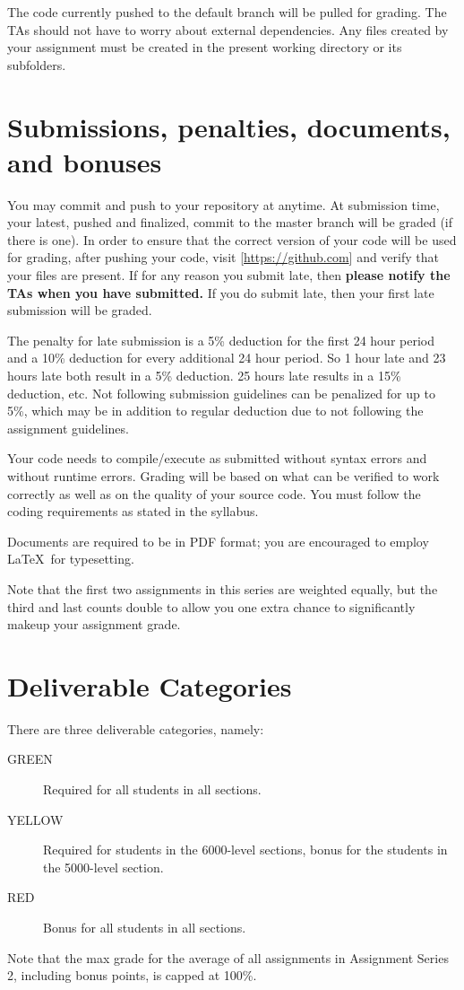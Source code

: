 \documentclass{article}
\begin{document}
The code currently pushed to the default branch will be pulled for grading. The TAs should not have to worry about external dependencies. Any files created by your assignment must be created in the present working directory or its subfolders.


\section*{Submissions, penalties, documents, and bonuses}
You may commit and push to your repository at anytime. At submission time, your latest, pushed and finalized, commit to the master branch will be graded (if there is one). In order to ensure that the correct version of your code will be used for grading, after pushing your code, visit [\url{https://github.com}] and verify that your files are present. If for any reason you submit late, then \textbf{please notify the TAs when you have submitted.} If you do submit late, then your first late submission will be graded.

The penalty for late submission is a 5\% deduction for the first 24 hour period and a 10\% deduction for every additional 24 hour period. So 1 hour late and 23 hours late both result in a 5\% deduction. 25 hours late results in a 15\% deduction, etc. Not following submission guidelines can be penalized for up to 5\%, which may be in addition to regular deduction due to not following the assignment guidelines.

Your code needs to compile/execute as submitted without syntax errors and without runtime errors. Grading will be based on what can be verified to work correctly as well as on the quality of your source code. You must follow the coding requirements as stated in the syllabus.

Documents are required to be in PDF format; you are encouraged to employ \LaTeX~for typesetting.

Note that the first two assignments in this series are weighted equally, but the third and last counts double to allow you one extra chance to significantly makeup your assignment grade.


\section*{Deliverable Categories}
There are three deliverable categories, namely:
\begin{description}
\item[GREEN] Required for all students in all sections.
\item[YELLOW] Required for students in the 6000-level sections, bonus for the students in the 5000-level section.
\item[RED] Bonus for all students in all sections.
\end{description}
Note that the max grade for the average of all assignments in Assignment Series 2, including bonus points, is capped at 100\%.
\end{document}
